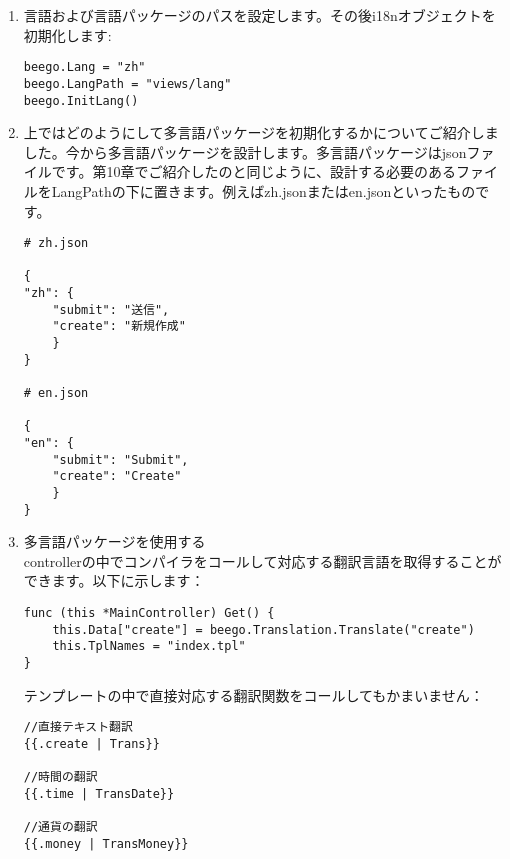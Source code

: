 \begin{enumerate}
  \item 言語および言語パッケージのパスを設定します。その後i18nオブジェクトを初期化します:
\begin{lstlisting}[numbers=none]
beego.Lang = "zh"
beego.LangPath = "views/lang"
beego.InitLang()
\end{lstlisting}
  \item 上ではどのようにして多言語パッケージを初期化するかについてご紹介しました。今から多言語パッケージを設計します。多言語パッケージはjsonファイルです。第10章でご紹介したのと同じように、設計する必要のあるファイルをLangPathの下に置きます。例えばzh.jsonまたはen.jsonといったものです。
\begin{lstlisting}[numbers=none]
# zh.json

{
"zh": {
    "submit": "送信",
    "create": "新規作成"
    }
}

# en.json

{
"en": {
    "submit": "Submit",
    "create": "Create"
    }
}
\end{lstlisting}
  \item 多言語パッケージを使用する\\ controllerの中でコンパイラをコールして対応する翻訳言語を取得することができます。以下に示します：
\begin{lstlisting}[numbers=none]
func (this *MainController) Get() {
    this.Data["create"] = beego.Translation.Translate("create")
    this.TplNames = "index.tpl"
}
\end{lstlisting}
テンプレートの中で直接対応する翻訳関数をコールしてもかまいません：
\begin{lstlisting}[numbers=none]
//直接テキスト翻訳
{{.create | Trans}}

//時間の翻訳
{{.time | TransDate}}

//通貨の翻訳
{{.money | TransMoney}}
\end{lstlisting}
\end{enumerate}

